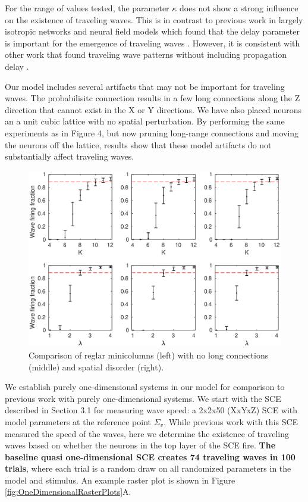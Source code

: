 For the range of values tested, the parameter $\kappa$ does not show a strong influence on the existence of traveling waves. 
This is in contrast to previous work in largely isotropic networks and neural field models which found that the delay parameter is important for the emergence of traveling waves \citet{Senk2020}\citet{Atay2006}\citet{Roxin2005}.
However, it is consistent with other work that found traveling wave patterns without including propagation delay \citet{Folias2012}\citet{Wyller2007}.

Our model includes several artifacts that may not be important for traveling waves.
The probabilisitc connection results in a few long connections along the Z direction that cannot exist in the X or Y directions.
We have also placed neurons an a unit cubic lattice with no spatial perturbation.
By performing the same experiments as in Figure 4, but now pruning long-range connections and moving the neurons off the lattice, 
results show that these model artifacts do not substantially affect traveling waves.
\begin{figure}[!htb]
 \centering
 \includegraphics[width=\textwidth]{fig/LongConnections_SpatialDisorder}
 \caption{Comparison of reglar minicolumns (left) with no long connections (middle) and spatial disorder (right).  }
 \label{fig:long_connx}
\end{figure}

\FloatBarrier



We establish purely one-dimensional systems in our model for comparison to previous work with purely one-dimensional systems.
We start with the SCE described in Section 3.1 for measuring wave speed: a 2x2x50 (XxYxZ) SCE with model parameters at the reference point $\Sigma_v$. 
While previous work with this SCE measured the speed of the waves, here we determine the existence of traveling waves based on whether the neurons in the top layer of the SCE fire.
\textbf{The baseline quasi one-dimensional SCE creates 74 traveling waves in 100 trials}, where each trial is a random draw on all randomized parameters in the model and stimulus.
An example raster plot is shown in Figure \ref{fig:OneDimensionalRasterPlots}A.


